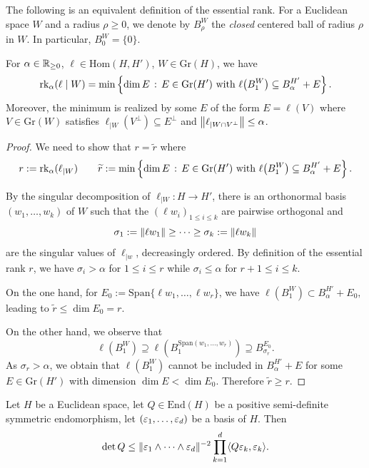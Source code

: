 The following is an equivalent definition of the essential rank.
For a Euclidean space $W$ and a radius $\rho \geq 0$, we denote by $B_\rho^W$ the \emph{closed} centered ball of radius $\rho$ in $W$.
In particular, $B^W_0 = \{0\}$.
\begin{lemma}
\label{lem:essential_rank_eq}
For $\alpha \in \mathbb{R}_{\geq 0}$, $\ell \in \mathrm{Hom}(H,H')$,  $W \in \mathrm{Gr}(H)$, we have
\[
\mathrm{rk}_{\alpha}(\ell \mid W) = \min \left\{ \dim E \,:\, E \in \mathrm{Gr}(H') \text{ with } \ell \bigl(B^W_1\bigr) \subseteq B^{H'}_\alpha + E \right\}.
\]
Moreover, the minimum is realized by some $E$ of the form $E=\ell(V)$ where $V\in\mathrm{Gr}(W)$ satisfies $\ell_{|W}(V^\perp)\subseteq E^\perp$ and $\left\lVert \ell_{|W\cap V^\perp} \right\rVert \leq \alpha$.
\end{lemma}

\begin{proof}
We need to show that $r=\widetilde r$ where
\[
r:=\mathrm{rk}_\alpha(\ell_{|W})  \quad \quad \widetilde{r}:=\min \left\{ \dim E \,:\, E \in \mathrm{Gr}(H') \text{ with } \ell \bigl(B^W_1\bigr) \subseteq B^{H'}_\alpha + E \right\}.
\]

By the singular decomposition of $\ell_{|W} : H \to H'$, there is an orthonormal basis $(w_1, \dotsc, w_k)$ of $W$ such that the $(\ell w_i)_{1\leq i \leq k}$ are pairwise orthogonal and
\[
\sigma_1 := \left\lVert \ell w_1 \right\rVert \geq \dots \geq \sigma_k :=\left\lVert \ell w_k \right\rVert
\]
are the singular values of $\ell_{|w}$, decreasingly ordered.
By definition of the essential rank $r$, we have $\sigma_i > \alpha$ for $1 \leq i \leq r$ while $\sigma_i \leq \alpha$ for $r + 1 \leq i \leq k$.

On the one hand, for $E_0 := \mathrm{Span}\{\ell w_1, \dotsc, \ell w_r \}$, we have
\(
\ell(B_1^W) \subset B^{H'}_\alpha + E_0,
\)
leading to $\widetilde r \leq \dim E_0 = r $.

On the other hand, we observe that
$$\ell(B^W_{1})\supseteq \ell(B^{\mathrm{Span}(w_{1}, \dots, w_{r})}_{1}) \supseteq B^{E_{0}}_{\sigma_{r}}.$$
As $\sigma_{r}>\alpha$, we obtain that $\ell(B^W_{1})$ cannot be included in  $B_\alpha^{H'} + E$ for some $E\in \mathrm{Gr}(H')$ with dimension $\dim E<\dim E_{0}$. Therefore $\widetilde{r}\geq r$.
\end{proof}


\begin{lemma}
\label{lem:Choleski}
Let $H$ be a Euclidean space, let $Q\in \mathrm{End}(H)$ be a positive semi-definite symmetric endomorphism,  let  $(\varepsilon_{1}, \dots, \varepsilon_{d})$ be a basis of $H$.
Then
\begin{equation*}
\det Q \leq \|\varepsilon_{1}\wedge \dots \wedge \varepsilon_{d}\|^{-2}\prod_{k=1}^d \langle Q \varepsilon_{k}, \varepsilon_{k}\rangle.
\end{equation*}
\end{lemma}


